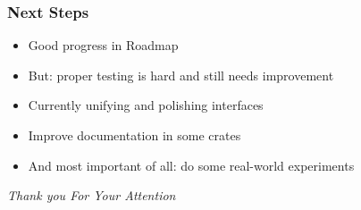 \documentclass[xcolor=x11names,compress]{beamer}
\begin{document}
\begin{frame}
    \frametitle{Next Steps}

    \begin{itemize}
        \item<2-> Good progress in Roadmap
        \item<3-> But: proper testing is hard and still needs improvement
        \item<4-> Currently unifying and polishing interfaces
        \item<5-> Improve documentation in some crates
        \item<6-> And most important of all: do some real-world experiments
    \end{itemize}

\end{frame}

\begin{frame}
	\centering \Large

	\emph{Thank you For Your Attention} 

    \vspace{5em}

\end{frame}
\end{document}
